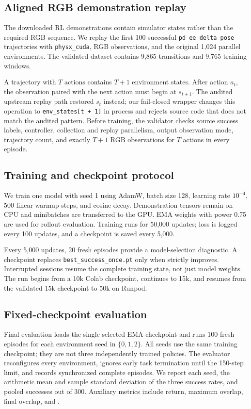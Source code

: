\subsection{Aligned RGB demonstration replay}
\label{sec:aligned-replay}

The downloaded RL demonstrations contain simulator states rather than the required RGB sequence.
We replay the first 100 successful \texttt{pd\_ee\_delta\_pose} trajectories with
\texttt{physx\_cuda}, RGB observations, and the original 1,024 parallel environments. The
validated dataset contains 9,865 transitions and 9,765 training windows.

A trajectory with $T$ actions contains $T+1$ environment states. After action $a_t$, the
observation paired with the next action must begin at $s_{t+1}$. The audited upstream replay path
restored $s_t$ instead; our fail-closed wrapper changes this operation to
\texttt{env\_states[t + 1]} in process and rejects source code that does not match the audited
pattern. Before training, the validator checks source success labels, controller, collection and
replay parallelism, output observation mode, trajectory count, and exactly $T+1$ RGB observations
for $T$ actions in every episode.

\subsection{Training and checkpoint protocol}

We train one model with seed 1 using AdamW, batch size 128, learning rate $10^{-4}$, 500 linear
warmup steps, and cosine decay. Demonstration tensors remain on CPU and minibatches are transferred
to the GPU. EMA weights with power 0.75 are used for rollout evaluation. Training runs for 50,000
updates; loss is logged every 100 updates, and a checkpoint is saved every 5,000.

Every 5,000 updates, 20 fresh episodes provide a model-selection diagnostic. A checkpoint replaces
\texttt{best\_success\_once.pt} only when \successonce strictly improves. Interrupted sessions
resume the complete training state, not just model weights. The run begins from a 10k Colab
checkpoint, continues to 15k, and resumes from the validated 15k checkpoint to 50k on Runpod.

\subsection{Fixed-checkpoint evaluation}

Final evaluation loads the single selected EMA checkpoint and runs 100 fresh episodes for each
environment seed in $\{0,1,2\}$. All seeds use the same training checkpoint; they are not three
independently trained policies. The evaluator reconfigures every environment, ignores early task
termination until the 150-step limit, and records synchronized complete episodes. We report each
seed, the arithmetic mean and sample standard deviation of the three success rates, and pooled
successes out of 300. Auxiliary metrics include return, maximum overlap, final overlap, and
\successend.
